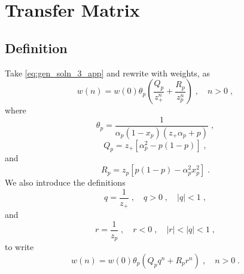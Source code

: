 \documentclass[a4paper,10pt]{article}
\begin{document}
\section{Transfer Matrix}

\subsection{Definition}

Take \eqref{eq:gen_soln_3_app} and rewrite with weights, as
\begin{equation}
  w(n) = w(0) \theta_p \left( \frac{Q_p}{z_+^{n}} + \frac{R_p}{z_p^{n}}  \right) \;, \quad n > 0 \;,
\end{equation}
where
\begin{equation}
 \theta_p = \frac{1}{ \alpha_p(1-x_p)(z_+\alpha_p + p)} \;, 
\end{equation}
\begin{equation}
  Q_p = z_+[\alpha_p^{2}-p(1-p)] \;,
\end{equation}
and
\begin{equation}
  R_p = z_p[ p(1-p) - \alpha_p^2 x_p^2] \;. 
\end{equation}
We also introduce the definitions
\begin{equation}
  q = \frac{1}{z_+} \;, \quad q > 0 \;, \quad |q| < 1 \;, 
\end{equation}
and
\begin{equation}
  r = \frac{1}{z_p} \;, \quad r < 0 \;, \quad |r| < |q|< 1 \;,
\end{equation}
to write
\begin{equation}
  w(n) = w(0) \theta_p \left( Q_p q^n + R_p r^n  \right) \;, \quad n > 0 \;.
\end{equation}
\end{document}
